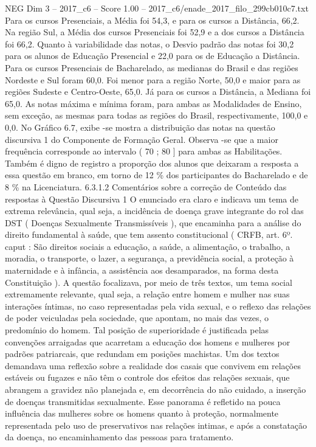 \begin{textsample}{NEG Dim 3 – 2017\_c6 – Score 1.00 – 2017\_c6/enade\_2017\_filo\_299cb010c7.txt}
Para os cursos Presenciais, a Média foi 54,3, e para os cursos a Distância, 66,2.
Na região Sul, a Média dos cursos Presenciais foi 52,9 e a dos cursos a Distância foi 66,2.
Quanto à variabilidade das notas, o Desvio padrão das notas foi 30,2 para os alunos de Educação Presencial e 22,0 para os de Educação a Distância.
Para os cursos Presenciais de Bacharelado, as medianas do Brasil e das regiões Nordeste e Sul foram 60,0.
Foi menor para a região Norte, 50,0 e maior para as regiões Sudeste e Centro-Oeste, 65,0.
Já para os cursos a Distância, a Mediana foi 65,0.
As notas máxima e mínima foram, para ambas as Modalidades de Ensino, sem exceção, as mesmas para todas as regiões do Brasil, respectivamente, 100,0 e 0,0.
No Gráfico 6.7, exibe -se mostra a distribuição das notas na questão discursiva 1 do Componente de Formação Geral.
Observa -se que a maior frequência corresponde ao intervalo ( 70 ; 80 ] para ambas as Habilitações.
Também é digno de registro a proporção dos alunos que deixaram a resposta a essa questão em branco, em torno de 12 \% dos participantes do Bacharelado e de 8 \% na Licenciatura. 6.3.1.2 Comentários sobre a correção de Conteúdo das respostas à Questão Discursiva 1 O enunciado era claro e indicava um tema de extrema relevância, qual seja, a incidência de doença grave integrante do rol das DST ( Doenças Sexualmente Transmissíveis ), que encaminha para a análise do direito fundamental à saúde, que tem assento constitucional ( CRFB, art. 6º. caput : São direitos sociais a educação, a saúde, a alimentação, o trabalho, a moradia, o transporte, o lazer, a segurança, a previdência social, a proteção à maternidade e à infância, a assistência aos desamparados, na forma desta Constituição ).
A questão focalizava, por meio de três textos, um tema social extremamente relevante, qual seja, a relação entre homem e mulher nas suas interações íntimas, no caso representadas pela vida sexual, e o reflexo das relações de poder veiculadas pela sociedade, que apontam, no mais das vezes, o predomínio do homem.
Tal posição de superioridade é justificada pelas convenções arraigadas que acarretam a educação dos homens e mulheres por padrões patriarcais, que redundam em posições machistas.
Um dos textos demandava uma reflexão sobre a realidade dos casais que convivem em relações estáveis ou fugazes e não têm o controle dos efeitos das relações sexuais, que abrangem a gravidez não planejada e, em decorrência do não cuidado, a inserção de doenças transmitidas sexualmente.
Esse panorama é refletido na pouca influência das mulheres sobre os homens quanto à proteção, normalmente representada pelo uso de preservativos nas relações intimas, e após a constatação da doença, no encaminhamento das pessoas para tratamento.

\end{textsample}
